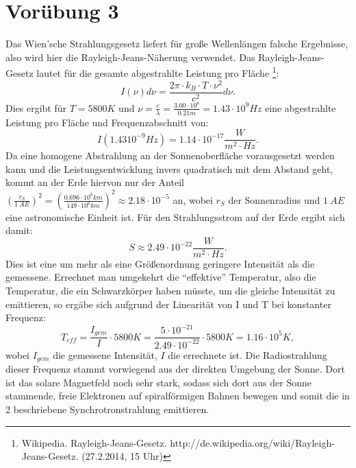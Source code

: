 \documentclass[titlepage]{scrartcl}
\begin{document}
\section{Vorübung 3}
Das Wien'sche Strahlungsgesetz liefert für große Wellenlängen falsche Ergebnisse, also wird hier die Rayleigh-Jeans-Näherung verwendet.
Das Rayleigh-Jeans-Gesetz lautet für die gesamte abgestrahlte Leistung pro Fläche \footnote{Wikipedia. Rayleigh-Jeans-Gesetz. http://de.wikipedia.org/wiki/Rayleigh-Jeans-Gesetz. (27.2.2014, 15 Uhr)}: 
\begin{equation}
I(\nu) d\nu = \frac{2\pi \cdot k_B \cdot T \cdot \nu^2}{c^2} d\nu. 
\end{equation}
Dies ergibt für $ T = 5800 K$ und $\nu = \frac{c}{\lambda} = \frac{3.00\cdot 10^8}{0.21 m} = 1.43 \cdot 10^9 Hz$ eine abgestrahlte Leistung pro Fläche und Frequenzabschnitt von: 
\begin{equation}
I(1.43 10^{-9} Hz) = 1.14 \cdot 10^{-17} \frac{W}{m^2 \cdot Hz}.
\end{equation}
Da eine homogene Abstrahlung an der Sonnenoberfläche vorausgesetzt werden kann und die Leistungsentwicklung invers quadratisch mit dem Abstand geht, kommt an der Erde hiervon nur der Anteil $ (\frac{r_S}{1\ AE})^2 = (\frac{0.696 \cdot 10^{6} km}{149 \cdot 10^6 km})^2 \approx 2.18 \cdot 10^{-5} $ an, wobei $r_S$ der Sonnenradius und $ 1\ AE$ eine astronomische Einheit ist. 
Für den Strahlungsstrom auf der Erde ergibt sich damit: 
\begin{equation}
S \approx 2.49 \cdot 10^{-22} \frac{W}{m^2 \cdot  Hz}.
\end{equation}
Dies ist eine um mehr als eine Größenordnung geringere Intensität als die gemessene. 
Errechnet man umgekehrt die \enquote{effektive} Temperatur, also die Temperatur, die ein Schwarzkörper haben müsste, um die gleiche Intensität zu emittieren, so ergäbe sich aufgrund der Linearität von I und T bei konstanter Frequenz: 
\begin{equation}
T_{eff} = \frac{I_{gem}}{I} \cdot 5800 K = \frac{5 \cdot 10^{-21}}{2.49 \cdot 10^{-22}} \cdot 5800 K = 1.16 \cdot 10^5 K,
\end{equation}
wobei $I_{gem}$ die gemessene Intensität, $I$ die errechnete ist. 
Die Radiostrahlung dieser Frequenz stammt vorwiegend aus der direkten Umgebung der Sonne. Dort ist das solare Magnetfeld noch sehr stark, sodass sich dort aus der Sonne stammende, freie Elektronen auf spiralförmigen Bahnen bewegen und somit die in 2 beschriebene Synchrotronstrahlung emittieren. 
\end{document}
